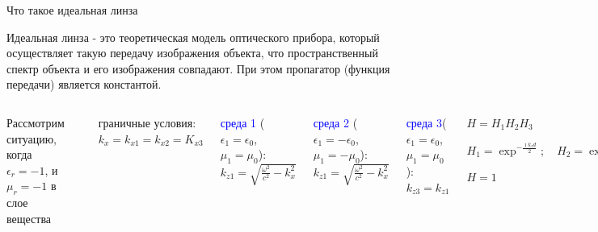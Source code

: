 \documentclass[9pt, compress, xcolor=table]{beamer}
\begin{document}
\begin{frame}{Что такое идеальная линза}

Идеальная линза - это теоретическая модель оптического прибора, который осуществляет такую передачу
изображения объекта, что пространственный спектр объекта и его изображения совпадают. При этом
пропагатор (функция передачи) является константой.

\begin{columns}[c]
\column{6cm}

{\scriptsize  Рассмотрим ситуацию, когда $\epsilon_r = -1$, и $\mu_r = -1$ в слое вещества}
\begin{center}
\includegraphics[width=4cm]{neg_ref_40a}
\end{center}

\column{6cm} {\scriptsize граничные условия: $k_x = k_{x1}= k_{x2} = K_{x3}$

\textcolor{blue}{среда 1} ($\epsilon_1 = \epsilon_0$, $\mu_1 = \mu_0$): $k_{z1} =
\sqrt{\frac{\omega^2}{c^2}-k_{x}^2}$

\textcolor{blue}{среда 2} ($\epsilon_1 = -\epsilon_0$, $\mu_1 = -\mu_0$): $k_{z1} =
\sqrt{\frac{\omega^2}{c^2}-k_{x}^2}$

\textcolor{blue}{среда 3}($\epsilon_1 = \epsilon_0$, $\mu_1 = \mu_0$): $k_{z3} = k_{z1}$
\begin{center}
$H=H_1H_2H_3$

$H_1= \exp^{-\frac{\imath k_z d}{2}};\quad H_2= \exp^{\imath k_z d};\quad H_3= \exp^{-\frac{\imath
k_z d}{2}}$

$H=1$
\end{center}
}
\end{columns}
\end{frame}
\end{document}
